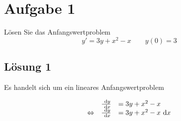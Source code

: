 \documentclass[main.tex]{subfiles}
\begin{document}
\section{Aufgabe 1}
Lösen Sie das Anfangswertproblem 
$$
    y' = 3y + x^2 -x \qquad y(0) = 3
$$

\subsection{Lösung 1}
Es handelt sich um ein lineares Anfangswertproblem

\begin{align*}
\begin{array}{rrl}
                        & \frac{~\mathrm{d}y}{~\mathrm{d}x} &= 3y + x^2 -x \\
        \Leftrightarrow & \frac{~\mathrm{d}y}{~\mathrm{d}x} &= 3y + x^2 -x ~\mathrm{d}x \\
\end{array}
\end{align*}
\end{document}
